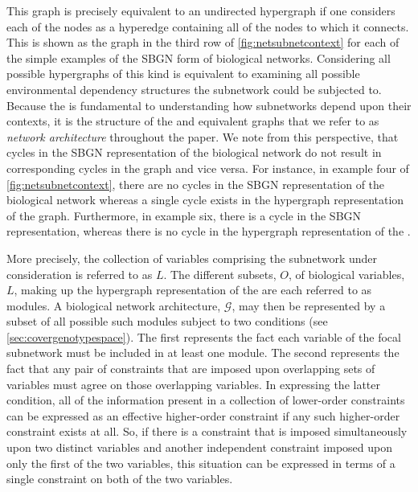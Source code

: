 This \AI{} graph is precisely equivalent to an undirected hypergraph if one considers each of the \AI{} nodes as a hyperedge containing all of the nodes to which it connects. This is shown as the \SH{} graph in the third row of \autoref{fig:netsubnetcontext} for each of the simple examples of the SBGN form of biological networks. Considering all possible hypergraphs of this kind is equivalent to examining all possible environmental dependency structures the subnetwork could be subjected to. Because the \AI{} is fundamental to understanding how subnetworks depend upon their contexts, it is the structure of the \AI{} and equivalent \SH{} graphs that we refer to as \emph{network architecture} throughout the paper. We note from this perspective, that cycles in the SBGN representation of the biological network do not result in corresponding cycles in the \AI{} graph and vice versa. For instance, in example four of \autoref{fig:netsubnetcontext}, there are no cycles in the SBGN representation of the biological network whereas a single cycle exists in the hypergraph representation of the \AI{} graph. Furthermore, in example six, there is a cycle in the SBGN representation, whereas there is no cycle in the hypergraph representation of the \AI{}.

More precisely, the collection of variables comprising the subnetwork under consideration is referred to as $L$. The different subsets, $O$, of biological variables, $L$, making up the hypergraph representation of the \AI{} are each referred to as modules. A biological network architecture, $\mathcal{G}$, may then be represented by a subset of all possible such modules subject to two conditions (see  \autoref{sec:covergenotypespace}). The first represents the fact each variable of the focal subnetwork must be included in at least one module. The second represents the fact that any pair of constraints that are imposed upon overlapping sets of variables must agree on those overlapping variables.  In expressing the latter condition, all of the information present in a collection of lower-order constraints can be expressed as an effective higher-order constraint if any such higher-order constraint exists at all. So, if there is a constraint that is imposed simultaneously upon two distinct variables and another independent constraint imposed upon only the first of the two variables, this situation can be expressed in terms of a single constraint on both of the two variables.

